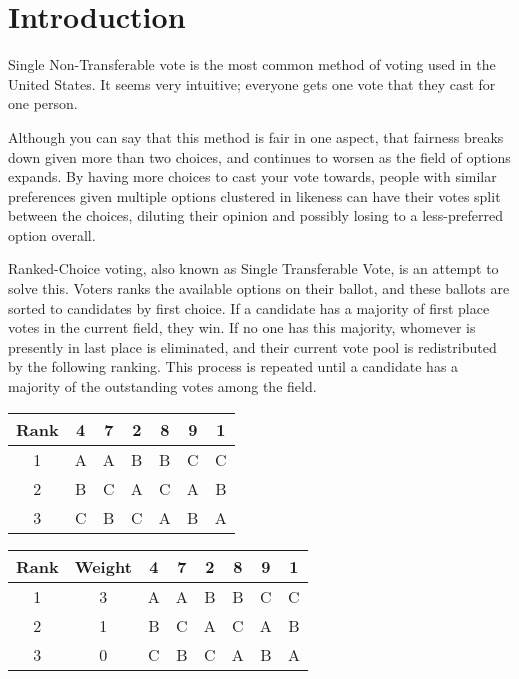 \chapter{Introduction}
\label{introduction}

Single Non-Transferable vote is the most common method of voting used in the United States. It seems very intuitive; everyone gets one vote that they cast for one person.

Although you can say that this method is fair in one aspect, that fairness breaks down given more than two choices, and continues to worsen as the field of options expands. By having more choices to cast your vote towards, people with similar preferences given multiple options clustered in likeness can have their votes split between the choices, diluting their opinion and possibly losing to a less-preferred option overall.

Ranked-Choice voting, also known as Single Transferable Vote, is an attempt to solve this. Voters ranks the available options on their ballot, and these ballots are sorted to candidates by first choice. If a candidate has a majority of first place votes in the current field, they win. If no one has this majority, whomever is presently in last place is eliminated, and their current vote pool is redistributed by the following ranking. This process is repeated until a candidate has a majority of the outstanding votes among the field.



\begin{center}
 \begin{tabular}{|c|c c c c c c|} 
 \hline
 Rank & 4 & 7 & 2 & 8 & 9 & 1 \\ [0.5ex] 
 \hline\hline
 1 & A & A & B & B & C & C \\ 
 \hline
 2 & B & C & A & C & A & B \\
 \hline
 3 & C & B & C & A & B & A \\
 \hline
\end{tabular}
\end{center}

\begin{center}
 \begin{tabular}{|c|c|c c c c c c|} 
 \hline
 Rank & Weight & 4 & 7 & 2 & 8 & 9 & 1 \\ [0.5ex] 
 \hline\hline
 1 & 3 & A & A & B & B & C & C \\ 
 \hline
 2 & 1 & B & C & A & C & A & B \\
 \hline
 3 & 0 & C & B & C & A & B & A \\
 \hline
\end{tabular}
\end{center}
